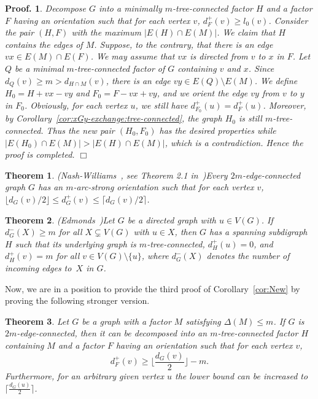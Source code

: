 \documentclass[10pt,bezier]{article}
\newtheorem{prethm}{{\bf Theorem}}[section]
\newenvironment{thm}{\begin{prethm}{\hspace{-0.5
em}{\bf.}}}{\end{prethm}}
\newtheorem{preproof}{{\bf Proof.}}
\newenvironment{proof}[1]{\begin{preproof}{\rm
#1}\hfill{$\Box$}}{\end{preproof}}
\begin{document}
%
\begin{proof}
{Decompose $G$ into a minimally $m$-tree-connected factor $H$ and a factor $F$ having an orientation such that for each vertex $v$, $d^+_F(v)\ge l_0(v)$. Consider the pair $(H,F)$ with the maximum $|E(H) \cap E(M)|$. 
We claim that $H$ contains the edges of $M$. Suppose, to the contrary, that there is an edge $vx\in E(M) \cap E(F)$.
We may assume that $vx$ is directed from $v$ to $x$ in $F$. Let $Q$ be a minimal $m$-tree-connected factor of $G$ containing $v$ and $x$. Since $d_Q(v)\ge m> d_{H\cap M}(v)$, there is an edge $vy\in E(Q)\setminus E(M)$.
We define $H_0=H+vx-vy$ and $F_0=F-vx+vy$, and we orient the edge $vy$ from $v$ to $y$ in $F_0$. 
Obviously, for each vertex $u$, we still have $d^+_{F_0}(u)=d^+_F(u)$.
Moreover, by Corollary~\ref{cor:xGy-exchange:tree-connected}, the graph $H_0$ is still $m$-tree-connected.
Thus the new pair $(H_0, F_0)$ has the desired properties while $|E(H_0) \cap E(M)| >|E(H) \cap E(M)|$, which is a contradiction.
Hence the proof is completed.
}\end{proof}
%
\begin{thm}{\rm (Nash-Williams~\cite{MR0118684}, see Theorem 2.1 in~\cite{BangJensen-Thomasse-Yeo-2003})}\label{thm:Nash-Williams}
{Every $2m$-edge-connected graph $G$ has an $m$-arc-strong orientation such that for each vertex $v$, 
$\lfloor d_G(v)/2\rfloor\le d^+_G(v) \le \lceil d_G(v)/2\rceil$.
}\end{thm}
%
\begin{thm}{\rm(Edmonds~\cite{Edmonds-1973})}\label{thm:Edmonds}
{Let $G$ be a directed graph with $u\in V(G)$. 
If $d^-_G(X)\ge m$ for all $X\subsetneq V(G)$ with $u\in X$, then
 $G$ has a spanning subdigraph $H$ such that its underlying graph is $m$-tree-connected, $d^+_{H}(u)=0$, and $d^+_{H}(v)=m$
 for all $v\in V(G)\setminus \{u\}$, where $d^-_G(X)$ denotes the number of incoming edges to~$X$ in $G$.
}\end{thm}
%
%
Now, we are in a position to provide the third proof of Corollary~\ref{cor:New} by proving the following stronger version.
%
\begin{thm}\label{thm:New}
{Let $G$ be a graph with a factor $M$ satisfying $\Delta(M)\le m$. If $G$ is $2m$-edge-connected, then it can be decomposed into an $m$-tree-connected factor $H$ containing $M$ and a factor $F$ having an orientation such that for each vertex $v$, 
$$d^+_F(v)\ge \lfloor \frac{d_G(v)}{2}\rfloor-m.$$
Furthermore, for an arbitrary given vertex $u$ the lower bound can be increased to $\lceil \frac{d_G(u)}{2}\rceil$.
}\end{thm}
\end{document}
